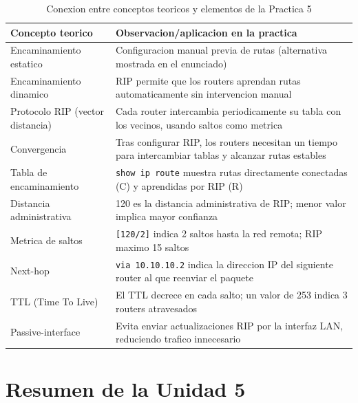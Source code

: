 \begin{table}[htbp]
\centering
\small
\caption{Conexion entre conceptos teoricos y elementos de la Practica 5}
\begin{tabularx}{\textwidth}{@{}lX@{}}
\toprule
\textbf{Concepto teorico} & \textbf{Observacion/aplicacion en la practica} \\
\midrule
Encaminamiento estatico & Configuracion manual previa de rutas (alternativa mostrada en el enunciado) \\
Encaminamiento dinamico & RIP permite que los routers aprendan rutas automaticamente sin intervencion manual \\
Protocolo RIP (vector distancia) & Cada router intercambia periodicamente su tabla con los vecinos, usando saltos como metrica \\
Convergencia & Tras configurar RIP, los routers necesitan un tiempo para intercambiar tablas y alcanzar rutas estables \\
Tabla de encaminamiento & \texttt{show ip route} muestra rutas directamente conectadas (C) y aprendidas por RIP (R) \\
Distancia administrativa & 120 es la distancia administrativa de RIP; menor valor implica mayor confianza \\
Metrica de saltos & \texttt{[120/2]} indica 2 saltos hasta la red remota; RIP maximo 15 saltos \\
Next-hop & \texttt{via 10.10.10.2} indica la direccion IP del siguiente router al que reenviar el paquete \\
TTL (Time To Live) & El TTL decrece en cada salto; un valor de 253 indica 3 routers atravesados \\
Passive-interface & Evita enviar actualizaciones RIP por la interfaz LAN, reduciendo trafico innecesario \\
\bottomrule
\end{tabularx}
\end{table}


\section{Resumen de la Unidad 5}

